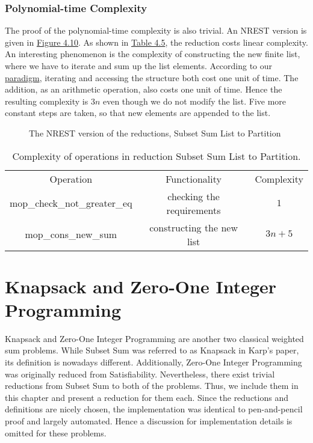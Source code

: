 \subsubsection{Polynomial-time Complexity}
The proof of the polynomial-time complexity is also trivial. 
An NREST version is given in \hyperref[fig:4.10]{Figure 4.10}. 
As shown in \hyperref[table:4.5]{Table 4.5}, the reduction costs linear complexity. 
An interesting phenomenon is the complexity of constructing the new finite list, where we have to iterate and sum up the list elements.
According to our \hyperref[para1]{paradigm}, iterating and accessing the structure both cost one unit of time. 
The addition, as an arithmetic operation, also costs one unit of time.
Hence the resulting complexity is $3n$ even though we do not modify the list.
Five more constant steps are taken, so that new elements are appended to the list.
\begin{figure}[!h]
    \caption{The NREST version of the reductions, Subset Sum List to Partition}
    \label{fig:4.10}
\end{figure}
\begin{table}[!h]
    \centering 
    \begin{tabular}{| c | c | c |}
        \hline 
        Operation & Functionality & Complexity \\ 
        \hhline{|=|=|=|}
        mop\_check\_not\_greater\_eq & checking the requirements & $1$ \\ 
        \hline 
        mop\_cons\_new\_sum & constructing the new list & $3n + 5$ \\ 
        \hline 
    \end{tabular}
    \caption{Complexity of operations in reduction Subset Sum List to Partition.}
    \label{table:4.5}
\end{table}

\section{Knapsack and Zero-One Integer Programming}
Knapsack and Zero-One Integer Programming are another two classical weighted sum problems. While Subset Sum was referred 
to as Knapsack in Karp's paper, its definition is nowadays different. Additionally, Zero-One Integer Programming 
was originally reduced from Satisfiability. Nevertheless, there exist trivial reductions from Subset Sum to both of the problems. Thus, 
we include them in this chapter and present a reduction for them each. 
Since the reductions and definitions are nicely chosen, the implementation was identical to pen-and-pencil proof 
and largely automated. Hence a discussion for implementation details is omitted for these problems.

